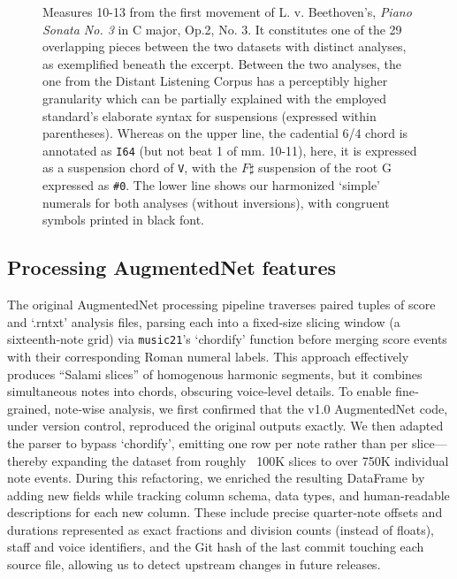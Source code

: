\documentclass[sigconf]{acmart} %
\begin{document}

\begin{figure}[h]
  
  \caption{Measures 10-13 from the first movement of L. v. Beethoven's, \textit{Piano Sonata No. 3} in C major, Op.2, No. 3. It constitutes one of the 29 overlapping pieces between the two datasets with distinct analyses, as exemplified beneath the excerpt. Between the two analyses, the one from the Distant Listening Corpus has a perceptibly higher granularity which can be partially explained with the employed standard's elaborate syntax for suspensions (expressed within parentheses). Whereas on the upper line, the cadential 6/4 chord is annotated as \texttt{I64} (but not beat 1 of mm. 10-11), here, it is expressed as a suspension chord of \texttt{V}, with the $F\sharp$ suspension of the root G expressed as \texttt{\#0}. The lower line shows our harmonized `simple' numerals for both analyses (without inversions), with congruent symbols printed in black font.}
  \label{fig:beethoven}
\end{figure}

\subsection{Processing AugmentedNet features}

The original AugmentedNet processing pipeline traverses paired tuples of score and `.rntxt' analysis files, parsing each into a fixed‐size slicing window (a sixteenth‐note grid) via \texttt{music21}’s `chordify' function before merging score events with their corresponding Roman numeral labels. This approach effectively produces “Salami slices” of homogenous harmonic segments, but it combines simultaneous notes into chords, obscuring voice‐level details. To enable fine‐grained, note‐wise analysis, we first confirmed that the v1.0 AugmentedNet code, under version control, reproduced the original outputs exactly.  We then adapted the parser to bypass `chordify', emitting one row per note rather than per slice---thereby expanding the dataset from roughly ~100K slices to over 750K individual note events.  During this refactoring, we enriched the resulting DataFrame by adding new fields while tracking column schema, data types, and human‐readable descriptions for each new column.  These include precise quarter‐note offsets and durations represented as exact fractions and division counts (instead of floats), staff and voice identifiers, and the Git hash of the last commit touching each source file, allowing us to detect upstream changes in future releases.
\end{document}
